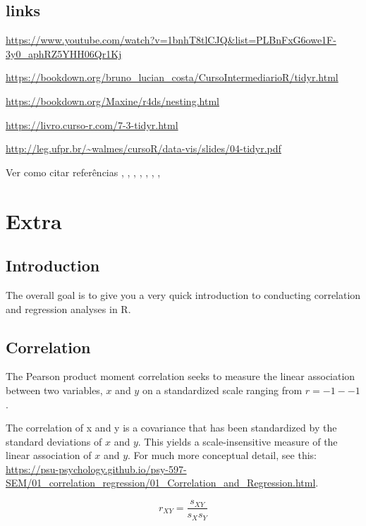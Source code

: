 \documentclass[
]{book}
\begin{document}
\hypertarget{links}{%
\section{links}\label{links}}

\url{https://www.youtube.com/watch?v=1bnhT8tlCJQ\&list=PLBnFxG6owe1F-3y0_aphRZ5YHH06Qr1Kj}

\url{https://bookdown.org/bruno_lucian_costa/CursoIntermediarioR/tidyr.html}

\url{https://bookdown.org/Maxine/r4ds/nesting.html}

\url{https://livro.curso-r.com/7-3-tidyr.html}

\url{http://leg.ufpr.br/~walmes/cursoR/data-vis/slides/04-tidyr.pdf}

Ver como citar referências \citet{tidyverse2019}, \citet{R-tidyverse}, \citet{R-tidyr}, \citet{R-ggplot2}, \citet{R-purrr}, \citet{R-dplyr}, \citet{R-knitr}, \citet{R-bookdown}

\hypertarget{extra}{%
\chapter{Extra}\label{extra}}

\hypertarget{introduction}{%
\section{Introduction}\label{introduction}}

The overall goal is to give you a very quick introduction to conducting correlation and regression analyses in R.

\hypertarget{correlation}{%
\section{Correlation}\label{correlation}}

The Pearson product moment correlation seeks to measure the linear association between two variables, \(x\) and \(y\) on a standardized scale ranging from \(r = -1 -- 1\).

The correlation of x and y is a covariance that has been standardized by the standard deviations of \(x\) and \(y\). This yields a scale-insensitive measure of the linear association of \(x\) and \(y\). For much more conceptual detail, see this: \url{https://psu-psychology.github.io/psy-597-SEM/01_correlation_regression/01_Correlation_and_Regression.html}.

\[r_{XY}= \frac{s_{XY}}{s_{X} s_{Y}}\]
\end{document}
